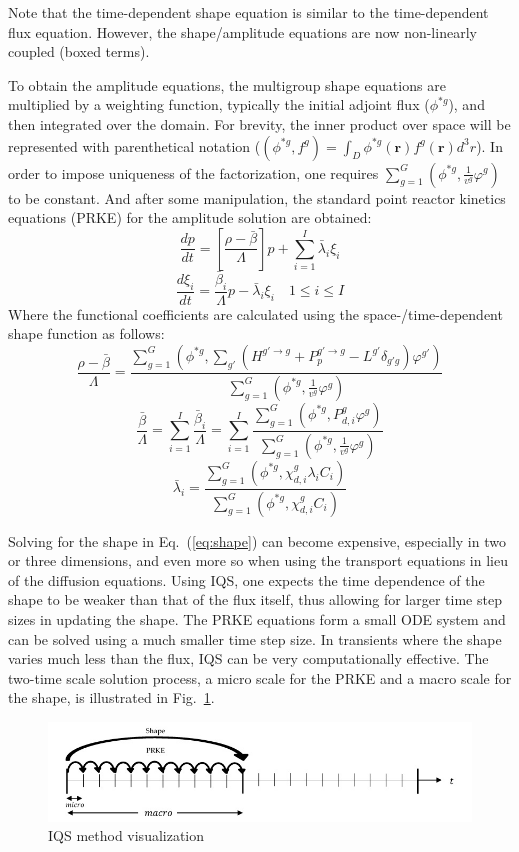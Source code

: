\documentclass{anstrans}
\renewcommand{\vec}[1]{\bm{#1}} %
\newcommand{\eqt}[1]{Eq.~(\ref{#1})}                     %
\newcommand{\fig}[1]{Fig.~\ref{#1}}                      %
\newcommand{\be}{\begin{equation}}
\newcommand{\ee}{\end{equation}}
\begin{document}
Note that the time-dependent shape equation is similar to the time-dependent flux equation. 
However, the shape/amplitude equations are now non-linearly coupled (boxed terms).

To obtain the amplitude equations, the multigroup shape equations are multiplied by a weighting function, typically the initial adjoint flux ($\phi^{*g}$), and then integrated over the domain.  For brevity, the inner product over space will be represented with parenthetical notation ($\left(\phi^{*g},f^g\right) = \int_D \phi^{*g}(\vec{r})f^g(\vec{r})d^3r
$). In order to impose uniqueness of the factorization, one requires $\sum_{g=1}^G\left(\phi^{*g},\frac{1}{v^g}\varphi^g\right)$ to be constant.  And after some manipulation, the standard point reactor kinetics equations (PRKE) for the amplitude solution are obtained:
\be
\frac{dp}{dt}=\left[\frac{\rho-\bar{\beta}}{\Lambda}\right]p+\sum_{i=1}^I\bar{\lambda}_i\xi_i
\ee
\be
\frac{d\xi_i}{dt}=\frac{\bar{\beta}_i}{\Lambda}p-\bar{\lambda}_i\xi_i \quad 1 \le i \le I 
\ee
Where the functional coefficients are calculated using the space-/time-dependent shape function as follows:
\be
\frac{\rho-\bar{\beta}}{\Lambda}=\frac{ \sum_{g=1}^G\left(\phi^{*g},\sum_{g'}(H^{g' \to g}+P_p^{g' \to g}-L^{g'}\delta_{g'g})\varphi^{g'}\right)}{\sum_{g=1}^G\left(\phi^{*g},\frac{1}{v^g}\varphi^g\right)}
\label{eq:rmb}
\ee
\be
\frac{\bar{\beta}}{\Lambda}=\sum_{i=1}^I\frac{\bar{\beta}_i}{\Lambda}=\sum_{i=1}^I\frac{\sum_{g=1}^G(\phi^{*g}, P_{d,i}^g \varphi^g)}{\sum_{g=1}^G\left(\phi^{*g},\frac{1}{v^g}\varphi^g\right)}
\ee
\be
\bar{\lambda}_i=\frac{\sum_{g=1}^G(\phi^{*g},\chi_{d,i}^g\lambda_i C_i)}{\sum_{g=1}^G(\phi^{*g},\chi_{d,i}^gC_i)}
\label{eq:l}
\ee

Solving for the shape in \eqt{eq:shape} can become expensive, especially in two or three dimensions, and even more so when using the transport equations in lieu of the diffusion equations.  Using IQS, one expects the time dependence of the shape to be weaker than that of the flux itself,  thus allowing for larger time step sizes in updating the shape. The PRKE equations form a small ODE system and can be solved using a much smaller time step size. In transients where the shape varies much less than the flux, IQS can be very computationally effective. The two-time scale solution process, a micro scale for the PRKE and a macro scale for the shape, is illustrated in \fig{fig:iqsviz}.  

\begin{figure}[!htbp]
\centering
\includegraphics[width=\linewidth]{IQS_visualization.jpg}
\caption{IQS method visualization}
\label{fig:iqsviz}
\end{figure}
\end{document}
